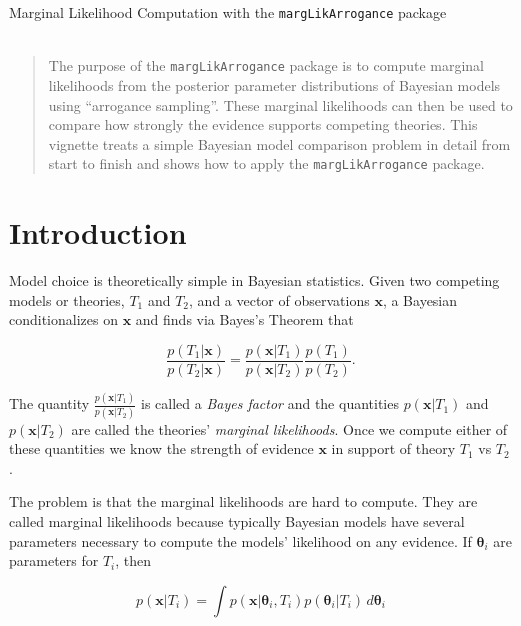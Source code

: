 \documentclass[letterpaper,12pt]{article}
\newcommand{\bx}{\boldsymbol x}
\newcommand{\btheta}{\boldsymbol \theta}%
\begin{document}
\thispagestyle{plain}\begin{center}{\LARGE Marginal Likelihood Computation with the \texttt{margLikArrogance} package }\\

\vspace{1em}{\large By  Benedict Escoto }\\

\end{center}
\begin{abstract}
  The purpose of the \texttt{margLikArrogance} package is to compute
  marginal likelihoods from the posterior parameter distributions of
  Bayesian models using ``arrogance sampling''.  These marginal
  likelihoods can then be used to compare how strongly the evidence
  supports competing theories.  This vignette treats a simple Bayesian
  model comparison problem in detail from start to finish and shows
  how to apply the \texttt{margLikArrogance} package.
\end{abstract}


\section{Introduction}

Model choice is theoretically simple in Bayesian statistics.  Given
two competing models or theories, $T_1$ and $T_2$, and a vector of
observations $\bx$, a Bayesian conditionalizes on $\bx$ and finds via
Bayes's Theorem that

\begin{equation} \label{bayes factor}
  \frac{p(T_1|\bx)}{p(T_2|\bx)} = \frac{p(\bx|T_1)}{p(\bx|T_2)} \frac{p(T_1)}{p(T_2)}.
  \end{equation}

The quantity $\frac{p(\bx|T_1)}{p(\bx|T_2)}$ is called a \emph{Bayes
  factor} and the quantities $p(\bx|T_1)$ and $p(\bx|T_2)$ are called the
theories' \emph{marginal likelihoods}.  Once we compute either of
these quantities we know the strength of evidence $\bx$ in support of
theory $T_1$ vs $T_2$.

The problem is that the marginal likelihoods are hard to compute.
They are called marginal likelihoods because typically Bayesian models
have several parameters necessary to compute the models' likelihood on
any evidence.  If $\btheta_i$ are parameters for $T_i$, then

\begin{equation} \label{main integral}
  p(\bx|T_i) = \int p(\bx|\btheta_i, T_i) p(\btheta_i|T_i) \, d\btheta_i
\end{equation}
\end{document}

